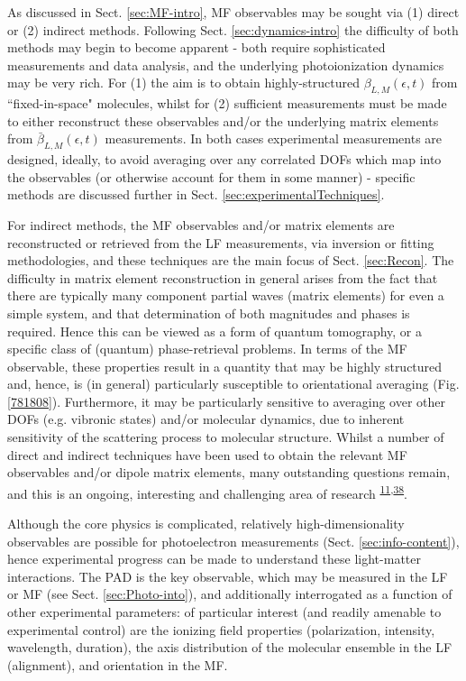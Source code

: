 \documentclass[10pt]{article}
\begin{document}
As discussed in Sect. \ref{sec:MF-intro}, MF observables may be sought via (1) direct or (2) indirect methods. Following Sect. \ref{sec:dynamics-intro} the difficulty of both methods may begin to become apparent - both require sophisticated measurements and data analysis, and the underlying photoionization dynamics may be very rich. For (1) the aim is to obtain highly-structured $\beta_{L,M}(\epsilon,t)$ from ``fixed-in-space" molecules, whilst for (2) sufficient measurements must be made to either reconstruct these observables and/or the underlying matrix elements from $\bar{\beta}_{L,M}(\epsilon,t)$ measurements. In both cases experimental measurements are designed, ideally, to avoid averaging over any correlated DOFs which map into the observables (or otherwise account for them in some manner) - specific methods are discussed further in Sect. \ref{sec:experimentalTechniques}.

For indirect methods, the MF observables and/or matrix elements are reconstructed or retrieved from the LF measurements, via inversion or fitting methodologies, and these techniques are the main focus of Sect. \ref{sec:Recon}. The difficulty in matrix element reconstruction in general arises from the fact that there are typically many component partial waves (matrix elements) for even a simple system, and that determination of both magnitudes and phases is required. Hence this can be viewed as a form of quantum tomography, or a specific class of (quantum) phase-retrieval problems. In terms of the MF observable, these properties result in a quantity that may be highly structured and, hence, is (in general) particularly susceptible to orientational averaging (Fig. \ref{781808}). Furthermore, it may be particularly sensitive to averaging over other DOFs (e.g. vibronic states) and/or molecular dynamics, due to inherent sensitivity of the scattering process to molecular structure. Whilst a number of direct and indirect techniques have been used to obtain the relevant MF observables and/or dipole matrix elements, many outstanding questions remain, and this is an ongoing, interesting and challenging area of research \textsuperscript{\hyperref[csl:11]{11},\hyperref[csl:38]{38}}.

Although the core physics is complicated, relatively high-dimensionality observables are possible for photoelectron measurements (Sect. \ref{sec:info-content}), hence experimental progress can be made to understand these light-matter interactions. The PAD is the key observable, which may be measured in the LF or MF (see Sect. \ref{sec:Photo-into}), and additionally interrogated as a function of other experimental parameters: of particular interest (and readily amenable to experimental control) are the ionizing field properties (polarization, intensity, wavelength, duration), the axis distribution of the molecular ensemble in the LF (alignment), and orientation in the MF. 
\end{document}
